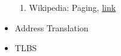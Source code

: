 \documentclass[12pt]{article}
\begin{document}
\begin{itemize}
    \begin{enumerate}[1)]
        \item Wikipedia: Paging, \href{https://en.wikipedia.org/wiki/Paging}{link}
    \end{enumerate}
    \item Address Translation
    \item TLBS
\end{itemize}
\end{document}

